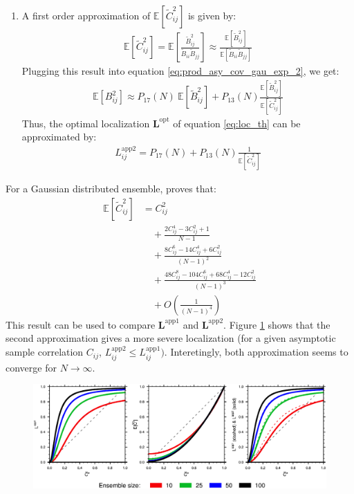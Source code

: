 \documentclass[12pt]{scrartcl}
\begin{document}
\begin{enumerate}
\item A first order approximation of $\mathbb{E} \left[\widetilde{C}_{ij}^2 \right]$ is given by:
\begin{align}
\label{eq:corsq_first_order}
\mathbb{E} \left[\widetilde{C}_{ij}^2 \right] = \mathbb{E} \left[\frac{\widetilde{B}^2_{ij}}{\widetilde{B}_{ii} \widetilde{B}_{jj}} \right] \approx \frac{\mathbb{E} \left[\widetilde{B}_{ij}^2 \right]}{\mathbb{E} \left[\widetilde{B}_{ii} \widetilde{B}_{jj}\right]}
\end{align}
Plugging this result into equation \eqref{eq:prod_asy_cov_gau_exp_2}, we get:
\begin{align}
\mathbb{E} \left[B^2_{ij}\right] \approx P_{17}(N) \ \mathbb{E} \left[\widetilde{B}_{ij}^2\right] + P_{13}(N) \frac{\mathbb{E} \left[\widetilde{B}_{ij}^2\right]}{\mathbb{E} \left[\widetilde{C}_{ij}^2 \right]}
\end{align}
Thus, the optimal localization $\mathbf{L}^\mathrm{opt}$ of equation \eqref{eq:loc_th} can be approximated by:
\begin{align}
\label{eq:local_gau_cor_2}
L^\mathrm{app2}_{ij} = P_{17}(N) + P_{13}(N) \frac{1}{\mathbb{E} \left[\widetilde{C}_{ij}^2\right]}
\end{align}
\end{enumerate}
For a Gaussian distributed ensemble, \citet{rady_2005} proves that:
\begin{align}
\mathbb{E} \left[\widetilde{C}_{ij}^2\right] & = C^2_{ij} \nonumber \\
& \quad + \frac{2 C^4_{ij} - 3 C^2_{ij} + 1}{N-1} \nonumber \\
& \quad + \frac{8 C^6_{ij} - 14 C^4_{ij} + 6 C^2_{ij}}{(N-1)^2} \nonumber \\
& \quad + \frac{48 C^8_{ij} - 104 C^6_{ij} + 68 C^4_{ij} - 12 C^2_{ij}}{(N-1)^3} \nonumber \\
& \quad + O\left(\frac{1}{(N-1)^4}\right)
\end{align}
This result can be used to compare $\mathbf{L}^\mathrm{app1}$ and $\mathbf{L}^\mathrm{app2}$. Figure \ref{fig:corloc} shows that the second approximation gives a more severe localization (for a given asymptotic sample correlation $C_{ij}$, $L^\mathrm{app2}_{ij} \le L^\mathrm{app1}_{ij})$. Interetingly, both approximation seems to converge for $N \rightarrow \infty$.

\begin{center}
\begin{figure}[h!]
  \noindent\includegraphics[width=\textwidth]{corloc.pdf}\\
  \caption{} \label{fig:corloc}
\end{figure}
\end{center}
\end{document}
